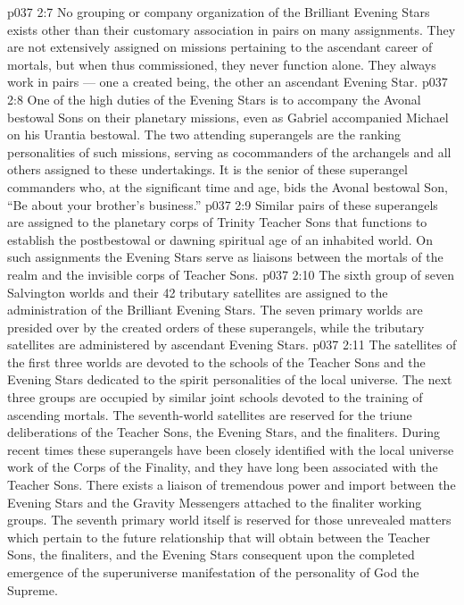 \vs p037 2:7 No grouping or company organization of the Brilliant Evening Stars exists other than their customary association in pairs on many assignments. They are not extensively assigned on missions pertaining to the ascendant career of mortals, but when thus commissioned, they never function alone. They always work in pairs --- one a created being, the other an ascendant Evening Star.
\vs p037 2:8 One of the high duties of the Evening Stars is to accompany the Avonal bestowal Sons on their planetary missions, even as Gabriel accompanied Michael on his Urantia bestowal. The two attending superangels are the ranking personalities of such missions, serving as cocommanders of the archangels and all others assigned to these undertakings. It is the senior of these superangel commanders who, at the significant time and age, bids the Avonal bestowal Son, “Be about your brother’s business.”
\vs p037 2:9 Similar pairs of these superangels are assigned to the planetary corps of Trinity Teacher Sons that functions to establish the postbestowal or dawning spiritual age of an inhabited world. On such assignments the Evening Stars serve as liaisons between the mortals of the realm and the invisible corps of Teacher Sons.
\vs p037 2:10 \pc {} The sixth group of seven Salvington worlds and their 42 tributary satellites are assigned to the administration of the Brilliant Evening Stars. The seven primary worlds are presided over by the created orders of these superangels, while the tributary satellites are administered by ascendant Evening Stars.
\vs p037 2:11 The satellites of the first three worlds are devoted to the schools of the Teacher Sons and the Evening Stars dedicated to the spirit personalities of the local universe. The next three groups are occupied by similar joint schools devoted to the training of ascending mortals. The seventh\hyp{}world satellites are reserved for the triune deliberations of the Teacher Sons, the Evening Stars, and the finaliters. During recent times these superangels have been closely identified with the local universe work of the Corps of the Finality, and they have long been associated with the Teacher Sons. There exists a liaison of tremendous power and import between the Evening Stars and the Gravity Messengers attached to the finaliter working groups. The seventh primary world itself is reserved for those unrevealed matters which pertain to the future relationship that will obtain between the Teacher Sons, the finaliters, and the Evening Stars consequent upon the completed emergence of the superuniverse manifestation of the personality of God the Supreme.
